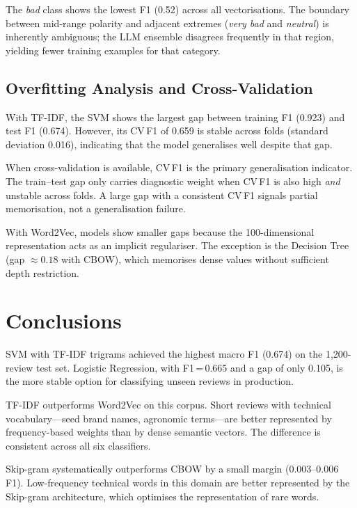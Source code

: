 \documentclass[12pt, letterpaper]{article}
\begin{document}
The \textit{bad} class shows the lowest F1 (0.52) across all vectorisations.
The boundary between mid-range polarity and adjacent extremes (\textit{very
bad} and \textit{neutral}) is inherently ambiguous; the LLM ensemble disagrees
frequently in that region, yielding fewer training examples for that category.

\subsection{Overfitting Analysis and Cross-Validation}

With TF-IDF, the SVM shows the largest gap between training F1 (0.923) and
test F1 (0.674). However, its CV\,F1 of 0.659 is stable across folds
(standard deviation 0.016), indicating that the model generalises well despite
that gap.

When cross-validation is available, CV\,F1 is the primary generalisation
indicator. The train--test gap only carries diagnostic weight when CV\,F1 is
also high \emph{and} unstable across folds. A large gap with a consistent
CV\,F1 signals partial memorisation, not a generalisation failure.

With Word2Vec, models show smaller gaps because the 100-dimensional
representation acts as an implicit regulariser. The exception is the Decision
Tree (gap ${\approx}0.18$ with CBOW), which memorises dense values without
sufficient depth restriction.

\section{Conclusions}

SVM with TF-IDF trigrams achieved the highest macro F1 (0.674) on the
1,200-review test set. Logistic Regression, with F1\,=\,0.665 and a gap of
only 0.105, is the more stable option for classifying unseen reviews in
production.

TF-IDF outperforms Word2Vec on this corpus. Short reviews with technical
vocabulary---seed brand names, agronomic terms---are better represented by
frequency-based weights than by dense semantic vectors. The difference is
consistent across all six classifiers.

Skip-gram systematically outperforms CBOW by a small margin (0.003--0.006 F1).
Low-frequency technical words in this domain are better represented by the
Skip-gram architecture, which optimises the representation of rare words.
\end{document}
